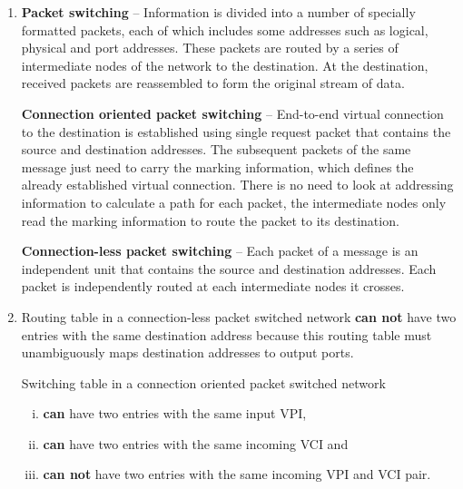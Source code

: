 \documentclass[a4paper, 11pt]{article}
\begin{document}
\begin{enumerate}
		\item %
			\textbf{Packet switching} -- Information is divided into a number of specially formatted packets, each of
			which includes some addresses such as logical, physical and port addresses. These packets are routed by a
			series of intermediate nodes of the network to the destination. At the destination, received packets are
			reassembled to form the original stream of data.

			\textbf{Connection oriented packet switching} -- End-to-end virtual connection to the destination is
			established using single request packet that contains the source and destination addresses. The subsequent
			packets of the same message just need to carry the marking information, which defines the already established
			virtual connection. There is no need to look at addressing information to calculate a path for each packet,
			the intermediate nodes only read the marking information to route the packet to its destination.

			\textbf{Connection-less packet switching} -- Each packet of a message is an independent unit that contains the
			source and destination addresses. Each packet is independently routed at each intermediate nodes it crosses.

		\item %
			Routing table in a connection-less packet switched network \textbf{can not} have two entries with the same destination
			address because this routing table must unambiguously maps destination addresses to output ports.

			Switching table in a connection oriented packet switched network
			\begin{enumerate}[i)]
				\item \textbf{can} have two entries with the same input VPI,
				\item \textbf{can} have two entries with the same incoming VCI and
				\item \textbf{can not} have two entries with the same incoming VPI and VCI pair.
			\end{enumerate}
	\end{enumerate}
\end{document}

